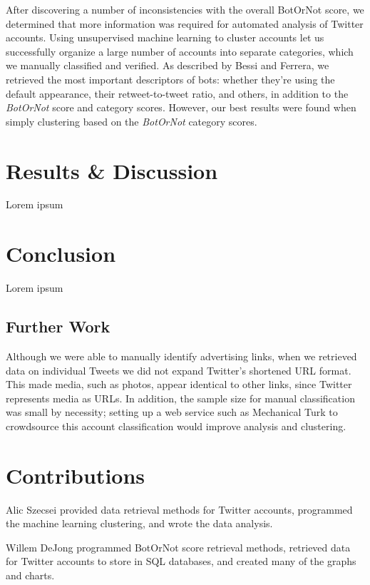 \documentclass{sig-alternate-05-2015}
\begin{document}
After discovering a number of inconsistencies with the overall BotOrNot score, we determined that more information was required for automated analysis of Twitter accounts. Using unsupervised machine learning to cluster accounts let us successfully organize a large number of accounts into separate categories, which we manually classified and verified. As described by Bessi and Ferrera\cite{Bessi:PresElect}, we retrieved the most important descriptors of bots: whether they're using the default appearance, their retweet-to-tweet ratio, and others, in addition to the \emph{BotOrNot} score and category scores. However, our best results were found when simply clustering based on the \emph{BotOrNot} category scores.



\section{Results \& Discussion}
Lorem ipsum

\section{Conclusion}
Lorem ipsum

\subsection{Further Work}
Although we were able to manually identify advertising links, when we retrieved data on individual Tweets we did not expand Twitter's shortened URL format. This made media, such as photos, appear identical to other links, since Twitter represents media as URLs. In addition, the sample size for manual classification was small by necessity; setting up a web service such as Mechanical Turk to crowdsource this account classification would improve analysis and clustering.

%

%
%

\appendix
\section{Contributions}
Alic Szecsei provided data retrieval methods for Twitter accounts, programmed the machine learning clustering, and wrote the data analysis.

Willem DeJong programmed BotOrNot score retrieval methods, retrieved data for Twitter accounts to store in SQL databases, and created many of the graphs and charts.

\end{document}
